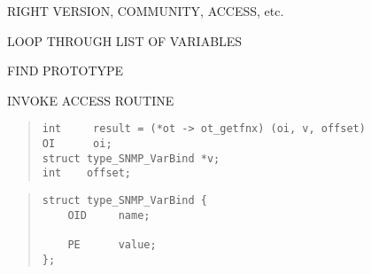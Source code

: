 

\begin{bwslide}

\begin{nrtc}
\item	RIGHT VERSION, COMMUNITY, ACCESS, etc.

\item	LOOP THROUGH LIST OF VARIABLES
    \begin{nrtc}
    \item	FIND PROTOTYPE

    \item	INVOKE ACCESS ROUTINE
    \end{nrtc}
\end{nrtc}
\begin{quote}\small\begin{verbatim}
int     result = (*ot -> ot_getfnx) (oi, v, offset)
OI      oi;
struct type_SNMP_VarBind *v;
int    offset;
\end{verbatim}\end{quote}
\end{bwslide}


\begin{bwslide}

\begin{quote}\small\begin{verbatim}
struct type_SNMP_VarBind {
    OID     name;

    PE      value;
};
\end{verbatim}\end{quote}
\end{bwslide}


